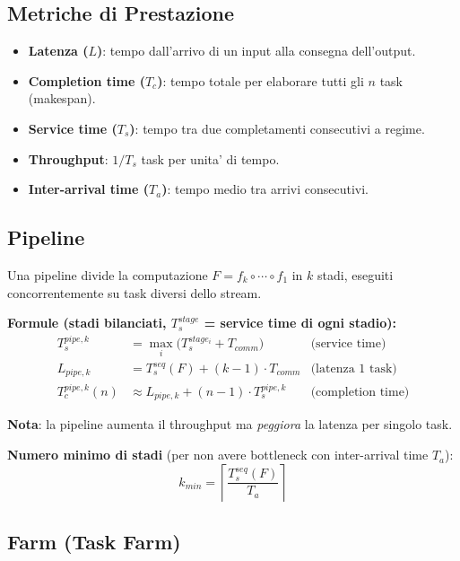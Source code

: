 \documentclass[11pt,a4paper]{article}
\theoremstyle{remark}
\begin{document}
\subsection{Metriche di Prestazione}

\begin{itemize}
  \item \textbf{Latenza ($L$)}: tempo dall'arrivo di un input alla consegna dell'output.
  \item \textbf{Completion time ($T_c$)}: tempo totale per elaborare tutti gli $n$ task (makespan).
  \item \textbf{Service time ($T_s$)}: tempo tra due completamenti consecutivi a regime.
  \item \textbf{Throughput}: $1/T_s$ task per unita' di tempo.
  \item \textbf{Inter-arrival time ($T_a$)}: tempo medio tra arrivi consecutivi.
\end{itemize}

\subsection{Pipeline}

Una pipeline divide la computazione $F = f_k \circ \cdots \circ f_1$ in $k$ stadi, eseguiti concorrentemente su task diversi dello stream.

\textbf{Formule (stadi bilanciati, $T_s^{stage}$ = service time di ogni stadio):}
\begin{align*}
T_s^{pipe,k} &= \max_i\bigl(T_s^{stage_i} + T_{comm}\bigr) & \text{(service time)} \\
L_{pipe,k} &= T_s^{seq}(F) + (k-1) \cdot T_{comm} & \text{(latenza 1 task)} \\
T_c^{pipe,k}(n) &\approx L_{pipe,k} + (n-1) \cdot T_s^{pipe,k} & \text{(completion time)}
\end{align*}

\textbf{Nota}: la pipeline aumenta il throughput ma \emph{peggiora} la latenza per singolo task.

\textbf{Numero minimo di stadi} (per non avere bottleneck con inter-arrival time $T_a$):
\begin{equation}
k_{min} = \left\lceil \frac{T_s^{seq}(F)}{T_a} \right\rceil
\end{equation}

\subsection{Farm (Task Farm)}
\end{document}
